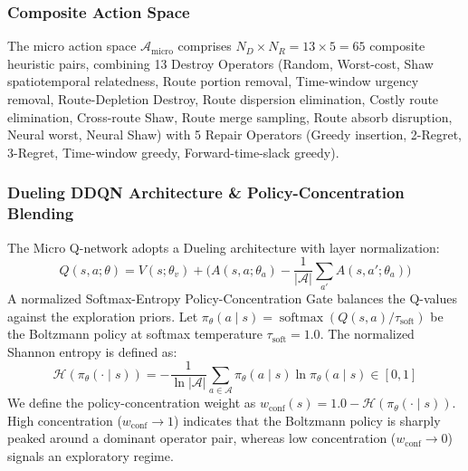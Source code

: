 \documentclass{ieeeaccess}
\begin{document}
\subsubsection{Composite Action Space}
The micro action space $\mathcal{A}_{\text{micro}}$ comprises $N_D \times N_R = 13 \times 5 = 65$ composite heuristic pairs, combining 13 Destroy Operators (Random, Worst-cost, Shaw spatiotemporal relatedness, Route portion removal, Time-window urgency removal, Route-Depletion Destroy, Route dispersion elimination, Costly route elimination, Cross-route Shaw, Route merge sampling, Route absorb disruption, Neural worst, Neural Shaw) with 5 Repair Operators (Greedy insertion, 2-Regret, 3-Regret, Time-window greedy, Forward-time-slack greedy).

\subsubsection{Dueling DDQN Architecture \& Policy-Concentration Blending}
The Micro Q-network adopts a Dueling architecture \cite{wang2016dueling} with layer normalization:
\begin{equation}
  Q(s, a; \theta) = V(s; \theta_v) + \Big( A(s, a; \theta_a) - \frac{1}{|\mathcal{A}|} \sum_{a'} A(s, a'; \theta_a) \Big)
  \label{eq:dueling_q}
\end{equation}
A normalized Softmax-Entropy Policy-Concentration Gate balances the Q-values against the exploration priors. Let $\pi_{\theta}(a \mid s) = \operatorname{softmax}(Q(s, a)/\tau_{\text{soft}})$ be the Boltzmann policy at softmax temperature $\tau_{\text{soft}} = 1.0$. The normalized Shannon entropy is defined as:
\begin{equation}
  \mathcal{H}(\pi_{\theta}(\cdot \mid s)) = -\frac{1}{\ln |\mathcal{A}|} \sum_{a \in \mathcal{A}} \pi_{\theta}(a \mid s) \ln \pi_{\theta}(a \mid s) \in [0, 1]
  \label{eq:policy_entropy}
\end{equation}
We define the policy-concentration weight as $w_{\text{conf}}(s) = 1.0 - \mathcal{H}(\pi_{\theta}(\cdot \mid s))$. High concentration ($w_{\text{conf}} \to 1$) indicates that the Boltzmann policy is sharply peaked around a dominant operator pair, whereas low concentration ($w_{\text{conf}} \to 0$) signals an exploratory regime.
\end{document}
